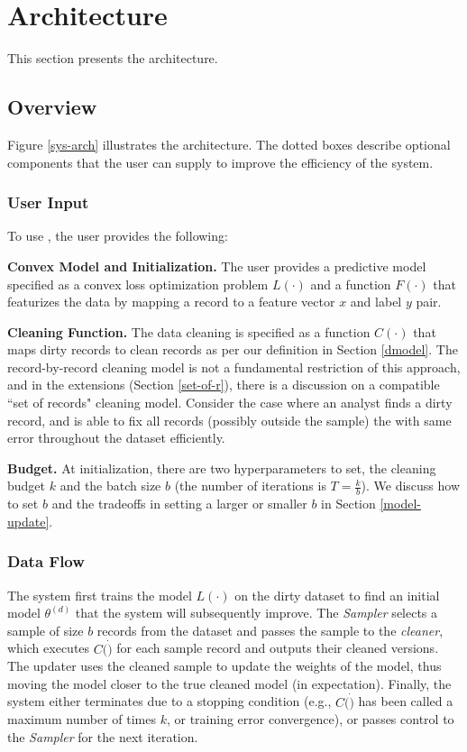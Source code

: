 \section{Architecture}\label{arch}
This section presents the \sys architecture.

\subsection{Overview}\label{sysover}
Figure \ref{sys-arch} illustrates the \sys architecture.
The dotted boxes describe optional components that the user can supply to improve the efficiency of the system.  

\subsubsection{User Input}\label{uinp}
To use \sys, the user provides the following:

\noindent\textbf{Convex Model and Initialization. } The user provides a predictive model specified as a convex loss optimization problem $L(\cdot)$ and a function $F(\cdot)$ that featurizes the data by mapping a record to a feature vector $x$ and label $y$ pair. 

\vspace{0.25em}

\noindent\textbf{Cleaning Function. } The data cleaning is specified as a function $C(\cdot)$ that maps dirty records to clean records as per our definition in Section \ref{dmodel}. The record-by-record cleaning model is not a fundamental restriction of this approach, and in the extensions (Section \ref{set-of-r}), there is a discussion on a compatible ``set of records" cleaning model. Consider the case where an analyst finds a dirty record, and is able to fix all records (possibly outside the sample) the with same error throughout the dataset efficiently.

\vspace{0.25em}

\noindent\textbf{Budget. } At initialization, there are two hyperparameters to set, the cleaning budget $k$ and the batch size $b$ (the number of iterations is $T = \frac{k}{b}$).
We discuss how to set $b$ and the tradeoffs in setting a larger or smaller $b$ in Section \ref{model-update}.

\subsubsection{Data Flow}
The system first trains the model $L(\cdot)$ on the dirty dataset to find an initial model $\theta^(d)$ that the system will subsequently improve.
The {\it Sampler} selects a sample of size $b$ records from the dataset and passes
the sample to the {\it cleaner}, which executes $C(\dot)$ for each sample record and outputs their cleaned versions.
The updater uses the cleaned sample to update the weights of the model, thus moving the model closer to the true cleaned model (in expectation).
Finally, the system either terminates due to a stopping condition (e.g., $C(\dot)$ has been called a maximum number of times $k$, or training error convergence),
or passes control to the {\it Sampler} for the next iteration.

